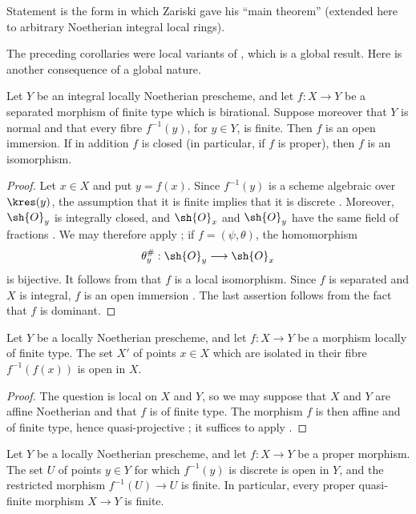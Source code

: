 Statement  is the form in which Zariski gave his
``main theorem'' (extended here to arbitrary Noetherian integral
local rings).

The preceding corollaries were local variants of
, which is a global result.  Here is another
consequence of a global nature.

\begin{corollary}[4.4.9]
\label{III.4.4.9}
Let $Y$ be an integral locally Noetherian prescheme, and let
$f:X\to Y$ be a separated morphism of finite type which is
birational.  Suppose moreover that $Y$ is normal and that every
fibre $f^{-1}(y)$, for $y\in Y$, is finite.  Then $f$ is an open
immersion.  If in addition $f$ is closed (in particular, if $f$ is
proper), then $f$ is an isomorphism.
\end{corollary}

\begin{proof}
Let $x\in X$ and put $y=f(x)$.  Since $f^{-1}(y)$ is a scheme
algebraic over $\kres(y)$, the assumption that it is finite implies
that it is discrete .  Moreover, $\sh{O}_y$ is
integrally closed, and $\sh{O}_x$ and $\sh{O}_y$ have the same field
of fractions .  We may therefore apply
; if $f=(\psi,\theta)$, the homomorphism
\[
  \theta_y^\#:\sh{O}_y\longrightarrow\sh{O}_x
\]
is bijective.  It follows from  that $f$ is a local
isomorphism.  Since $f$ is separated and $X$ is integral, $f$ is an
open immersion .  The last assertion follows from
the fact that $f$ is dominant.
\end{proof}

\begin{proposition}[4.4.10]
\label{III.4.4.10}
Let $Y$ be a locally Noetherian prescheme, and let $f:X\to Y$ be a
morphism locally of finite type.  The set $X'$ of points $x\in X$
which are isolated in their fibre $f^{-1}(f(x))$ is open in $X$.
\end{proposition}

\begin{proof}
The question is local on $X$ and $Y$, so we may suppose that $X$ and
$Y$ are affine Noetherian and that $f$ is of finite type.  The
morphism $f$ is then affine and of finite type, hence quasi-projective
; it suffices to apply .
\end{proof}


\begin{corollary}[4.4.11]
\label{III.4.4.11}
Let $Y$ be a locally Noetherian prescheme, and let $f:X\to Y$ be a
proper morphism.  The set $U$ of points $y\in Y$ for which
$f^{-1}(y)$ is discrete is open in $Y$, and the restricted morphism
$f^{-1}(U)\to U$ is finite.  In particular, every proper
quasi-finite morphism $X\to Y$ is finite.
\end{corollary}

